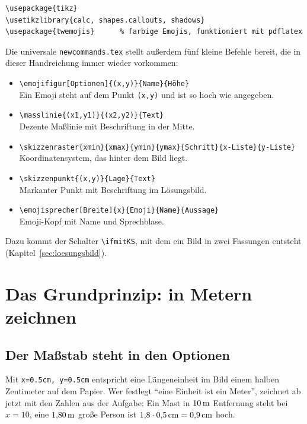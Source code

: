 \begin{lstlisting}[style=latex]
\usepackage{tikz}
\usetikzlibrary{calc, shapes.callouts, shadows}
\usepackage{twemojis}      % farbige Emojis, funktioniert mit pdflatex
\end{lstlisting}

Die universale \texttt{newcommands.tex} stellt außerdem fünf kleine Befehle bereit, die in dieser Handreichung immer wieder vorkommen:

\begin{itemize}
	\item \texttt{\textbackslash emojifigur}\texttt{[Optionen]\{(x,y)\}\{Name\}\{Höhe\}}\\ Ein Emoji steht auf dem Punkt \texttt{(x,y)} und ist so hoch wie angegeben.
	\item \texttt{\textbackslash masslinie}\texttt{\{(x1,y1)\}\{(x2,y2)\}\{Text\}}\\ Dezente Maßlinie mit Beschriftung in der Mitte.
	\item \texttt{\textbackslash skizzenraster}\texttt{\{xmin\}\{xmax\}\{ymin\}\{ymax\}\{Schritt\}\{x-Liste\}\{y-Liste\}}\\ Koordinatensystem, das hinter dem Bild liegt.
	\item \texttt{\textbackslash skizzenpunkt}\texttt{\{(x,y)\}\{Lage\}\{Text\}}\\ Markanter Punkt mit Beschriftung im Lösungsbild.
	\item \texttt{\textbackslash emojisprecher}\texttt{[Breite]\{x\}\{Emoji\}\{Name\}\{Aussage\}}\\ Emoji-Kopf mit Name und Sprechblase.
\end{itemize}

Dazu kommt der Schalter \texttt{\textbackslash ifmitKS}, mit dem ein Bild in zwei Fassungen entsteht (Kapitel~\ref{sec:loesungsbild}).



\section{Das Grundprinzip: in Metern zeichnen}


\subsection{Der Maßstab steht in den Optionen}

Mit \texttt{x=0.5cm, y=0.5cm} entspricht eine Längeneinheit im Bild einem halben Zentimeter auf dem Papier. Wer festlegt \enquote{eine Einheit ist ein Meter}, zeichnet ab jetzt mit den Zahlen aus der Aufgabe: Ein Mast in $\unit[10]{m}$ Entfernung steht bei $x=10$, eine $\unit[1{,}80]{m}$ große Person ist $1{,}8\cdot\unit[0{,}5]{cm}=\unit[0{,}9]{cm}$ hoch.

